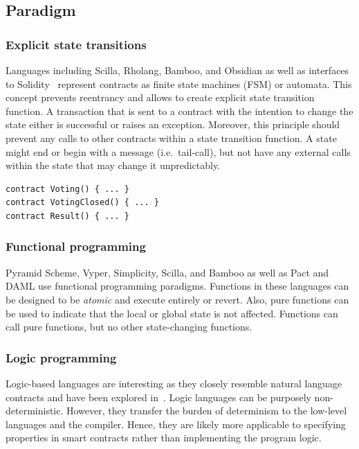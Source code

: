 \subsection{Paradigm}

\subsubsection{Explicit state transitions}
Languages including Scilla, Rholang, Bamboo, and Obsidian as well as interfaces to Solidity~\cite{Mavridou2018} represent contracts as finite state machines (FSM) or automata. This concept prevents reentrancy and allows to create explicit state transition function. A transaction that is sent to a contract with the intention to change the state either is successful or raises an exception. Moreover, this principle should prevent any calls to other contracts within a state transition function. A state might end or begin with a message (i.e.\ tail-call), but not have any external calls within the state that may change it unpredictably.

\begin{lstlisting}[caption={A separation of states represented in Bamboo, where each state represents a different contract at the same address.},label=lst:fsm,language=Solidity]
contract Voting() { ... }
contract VotingClosed() { ... }
contract Result() { ... }
\end{lstlisting}

\subsubsection{Functional programming}
Pyramid Scheme, Vyper, Simplicity, Scilla, and Bamboo as well as Pact and DAML use functional programming paradigms. Functions in these languages can be designed to be \emph{atomic} and execute entirely or revert. Also, pure functions can be used to indicate that the local or global state is not affected. Functions can call pure functions, but no other state-changing functions.

\subsubsection{Logic programming}
Logic-based languages are interesting as they closely resemble natural language contracts and have been explored in~\cite{Idelberger2016}. Logic languages can be purposely non-deterministic. However, they transfer the burden of determinism to the low-level languages and the compiler. Hence, they are likely more applicable to specifying properties in smart contracts rather than implementing the program logic.


